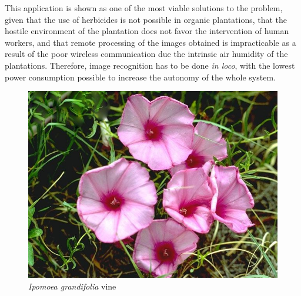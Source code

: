 \documentclass[
    12pt,                       %
    oneside,                    %
    a4paper,                    %
    brazil,                     %
    french,                     %
    spanish,                    %
    english,                    %
    ]{abntex2}
\begin{document}

This application is shown as one of the most viable solutions to the problem, given that the use of herbicides is not possible in organic plantations, that the hostile environment of the plantation does not favor the intervention of human workers, and that remote processing of the images obtained is impracticable as a result of the poor wireless communication due the intrinsic air humidity of the plantations. Therefore, image recognition has to be done \textit{in loco}, with the lowest power consumption possible to increase the autonomy of the whole system.

\begin{figure}[htb]
  \caption{\label{fig:ipomoea}\textit{Ipomoea grandifolia} vine}
  \begin{center}
    \includegraphics[scale=0.5]{images/Ipomoea_grandifolia76.jpg}
  \end{center}
\end{figure}

\end{document}
